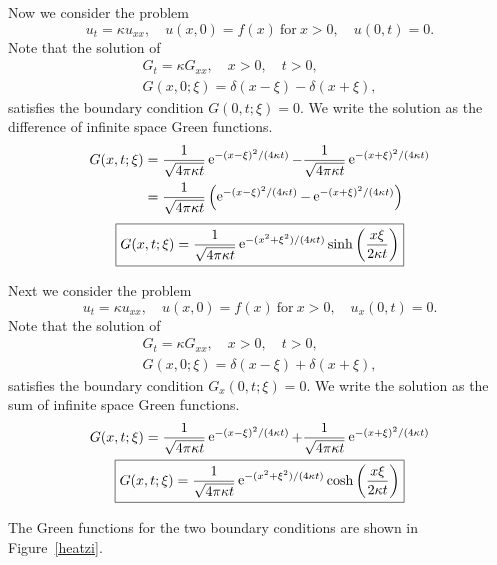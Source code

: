 {\begin{Solution}
  Now we consider the problem
  \[
  u_t = \kappa u_{x x}, \quad u(x,0) = f(x)\ \mathrm{for}\ x > 0, \quad u(0,t) = 0.
  \]
  Note that the solution of 
  \begin{gather*}
    G_t = \kappa G_{x x}, \quad x > 0, \quad t > 0, \\
    G(x,0;\xi) = \delta(x-\xi) - \delta(x+\xi),
  \end{gather*}
  satisfies the boundary condition $G(0,t;\xi) = 0$.
  We write the solution as the difference of infinite space Green functions.
  \begin{align*}
    G(x,t;\xi) &= \frac{1}{\sqrt{4 \pi \kappa t}} \mathop{\mathrm{e}}\nolimits^{-(x-\xi)^2  / (4 \kappa t)}
    - \frac{1}{\sqrt{4 \pi \kappa t}} \mathop{\mathrm{e}}\nolimits^{-(x+\xi)^2 / (4 \kappa t)} \\
    &= \frac{1}{\sqrt{4 \pi \kappa t}} \left( 
      \mathop{\mathrm{e}}\nolimits^{-(x-\xi)^2  / (4 \kappa t)}
      - \mathop{\mathrm{e}}\nolimits^{-(x+\xi)^2 / (4 \kappa t)} \right) 
  \end{align*}
  \[
  \boxed{
    G(x,t;\xi) = \frac{1}{\sqrt{4 \pi \kappa t}} 
    \mathop{\mathrm{e}}\nolimits^{-(x^2 + \xi^2) / (4 \kappa t)} 
    \sinh \left( \frac{x \xi}{2 \kappa t} \right)
    }
  \]

  Next we consider the problem
  \[
  u_t = \kappa u_{x x}, \quad u(x,0) = f(x)\ \mathrm{for}\ x > 0, 
  \quad u_x(0,t) = 0.
  \]
  Note that the solution of 
  \begin{gather*}
    G_t = \kappa G_{x x}, \quad x > 0, \quad t > 0, \\
    G(x,0;\xi) = \delta(x-\xi) + \delta(x+\xi),
  \end{gather*}
  satisfies the boundary condition $G_x(0,t;\xi) = 0$.
  We write the solution as the sum of infinite space Green functions.
  \begin{gather*}
    G(x,t;\xi) = \frac{1}{\sqrt{4 \pi \kappa t}} \mathop{\mathrm{e}}\nolimits^{-(x-\xi)^2  / (4 \kappa t)}
    + \frac{1}{\sqrt{4 \pi \kappa t}} \mathop{\mathrm{e}}\nolimits^{-(x+\xi)^2 / (4 \kappa t)} \\
    \boxed{
      G(x,t;\xi) = \frac{1}{\sqrt{4 \pi \kappa t}} 
      \mathop{\mathrm{e}}\nolimits^{-(x^2 + \xi^2) / (4 \kappa t)} 
      \cosh \left( \frac{x \xi}{2 \kappa t} \right)
      }
  \end{gather*}

  The Green functions for the two boundary conditions are shown in 
  Figure~\ref{heatzi}.


\end{Solution}}
